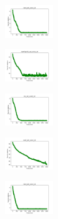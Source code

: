 \begin{figure}[H]
    \begin{subfigure}
        \centering
        \includegraphics[width=0.234\textwidth]{img/aggun/rand_set_const_10_277451237_cost.png}
    \end{subfigure}
    \hfill
    \begin{subfigure}
        \centering
        \includegraphics[width=0.234\textwidth]{img/aggun/newthyroid_set_const_10_277451237_cost.png}
    \end{subfigure}
    \hfill
    \begin{subfigure}
        \centering
        \includegraphics[width=0.234\textwidth]{img/aggun/iris_set_const_10_49258669_cost.png}
    \end{subfigure}
    \hfill
    \begin{subfigure}
        \centering
        \includegraphics[width=0.234\textwidth]{img/aggun/ecoli_set_const_10_49258669_cost.png}
    \end{subfigure}
    \hfill
    \begin{subfigure}
        \centering
        \includegraphics[width=0.234\textwidth]{img/aggun/rand_set_const_10_49258669_cost.png}
    \end{subfigure}
    \hfill
    \begin{subfigure}
        \centering

\end{subfigure}
\end{figure}
